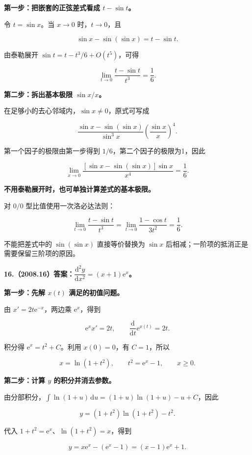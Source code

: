 \documentclass[UTF8,11pt,fontset=windows]{ctexart}
\begin{document}
\textbf{第一步：把嵌套的正弦差式看成 $t-\sin t$。}

令 $t=\sin x$。当 $x\to0$ 时，$t\to0$，且

$$
\sin x-\sin(\sin x)=t-\sin t.
$$

由泰勒展开 $\sin t=t-t^3/6+O(t^5)$，可得

$$
\lim_{t\to0}\frac{t-\sin t}{t^3}=\frac16.
$$

\textbf{第二步：拆出基本极限 $\sin x/x$。}

在足够小的去心邻域内，$\sin x\ne0$，原式可写成

$$
\frac{\sin x-\sin(\sin x)}{\sin^3x}
\left(\frac{\sin x}{x}\right)^4.
$$

第一个因子的极限由第一步得到 $1/6$，第二个因子的极限为1，因此

$$
\boxed{\lim_{x\to0}\frac{[\sin x-\sin(\sin x)]\sin x}{x^4}
=\frac16}.
$$

\textbf{不用泰勒展开时，也可单独计算差式的基本极限。}

对 $0/0$ 型比值使用一次洛必达法则：

$$
\lim_{t\to0}\frac{t-\sin t}{t^3}
=\lim_{t\to0}\frac{1-\cos t}{3t^2}
=\frac16.
$$

不能把差式中的 $\sin(\sin x)$ 直接等价替换为 $\sin x$ 后相减；一阶项的抵消正是需要保留三阶项的原因。

\clearpage

\textbf{16.（2008.16）答案：$\dfrac{\mathrm d^2y}{\mathrm dx^2}=(x+1)\mathrm e^x$。}

\textbf{第一步：先解 $x(t)$ 满足的初值问题。}

由 $x'=2t\mathrm e^{-x}$，两边乘 $\mathrm e^x$，得到

$$
\mathrm e^x x'=2t,
\qquad\frac{\mathrm d}{\mathrm dt}\mathrm e^{x(t)}=2t.
$$

积分得 $\mathrm e^x=t^2+C$。利用 $x(0)=0$，有 $C=1$，所以

$$
\boxed{x=\ln(1+t^2)},\qquad t^2=\mathrm e^x-1,
\qquad x\ge0.
$$

\textbf{第二步：计算 $y$ 的积分并消去参数。}

由分部积分，$\int\ln(1+u)\,\mathrm du=(1+u)\ln(1+u)-u+C$，因此

$$
y=(1+t^2)\ln(1+t^2)-t^2.
$$

代入 $1+t^2=\mathrm e^x$、$\ln(1+t^2)=x$，得到

$$
y=x\mathrm e^x-(\mathrm e^x-1)
=(x-1)\mathrm e^x+1.
$$
\end{document}
